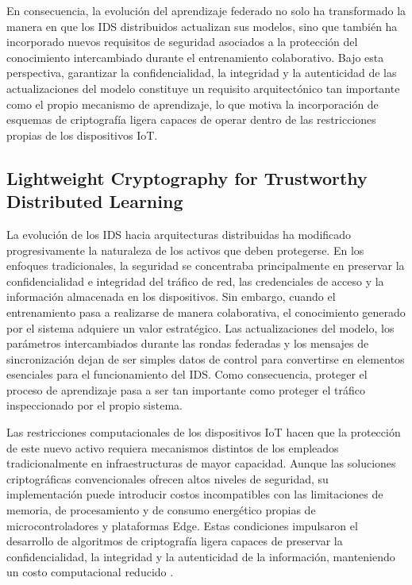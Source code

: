 \documentclass[journal,article,submit,moreauthors]{Definitions/mdpi}
\begin{document}
En consecuencia, la evolución del aprendizaje federado no solo ha transformado la manera en que los IDS distribuidos actualizan sus modelos, sino que también ha incorporado nuevos requisitos de seguridad asociados a la protección del conocimiento intercambiado durante el entrenamiento colaborativo. Bajo esta perspectiva, garantizar la confidencialidad, la integridad y la autenticidad de las actualizaciones del modelo constituye un requisito arquitectónico tan importante como el propio mecanismo de aprendizaje, lo que motiva la incorporación de esquemas de criptografía ligera capaces de operar dentro de las restricciones propias de los dispositivos IoT.

\subsection{Lightweight Cryptography for Trustworthy Distributed Learning}
La evolución de los IDS hacia arquitecturas distribuidas ha modificado progresivamente la naturaleza de los activos que deben protegerse. En los enfoques tradicionales, la seguridad se concentraba principalmente en preservar la confidencialidad e integridad del tráfico de red, las credenciales de acceso y la información almacenada en los dispositivos. Sin embargo, cuando el entrenamiento pasa a realizarse de manera colaborativa, el conocimiento generado por el sistema adquiere un valor estratégico. Las actualizaciones del modelo, los parámetros intercambiados durante las rondas federadas y los mensajes de sincronización dejan de ser simples datos de control para convertirse en elementos esenciales para el funcionamiento del IDS. Como consecuencia, proteger el proceso de aprendizaje pasa a ser tan importante como proteger el tráfico inspeccionado por el propio sistema.
%

Las restricciones computacionales de los dispositivos IoT hacen que la protección de este nuevo activo requiera mecanismos distintos de los empleados tradicionalmente en infraestructuras de mayor capacidad. Aunque las soluciones criptográficas convencionales ofrecen altos niveles de seguridad, su implementación puede introducir costos incompatibles con las limitaciones de memoria, de procesamiento y de consumo energético propias de microcontroladores y plataformas Edge. Estas condiciones impulsaron el desarrollo de algoritmos de criptografía ligera capaces de preservar la confidencialidad, la integridad y la autenticidad de la información, manteniendo un costo computacional reducido \cite{NISTIR8454,NIST800232,Gusita2025,Kaur2025}.
%
\end{document}
